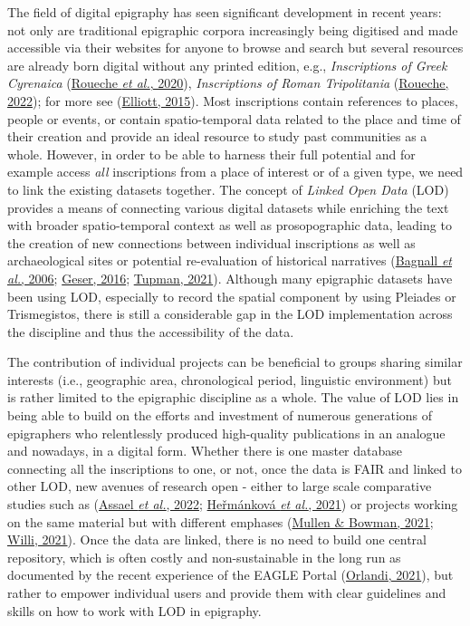 \documentclass[
  12pt,
]{scrreprt}
\begin{document}
The field of digital epigraphy has seen significant development in
recent years: not only are traditional epigraphic corpora increasingly
being digitised and made accessible via their websites for anyone to
browse and search but several resources are already born digital without
any printed edition, e.g., \emph{Inscriptions of Greek Cyrenaica}
(\protect\hyperlink{ref-roueche_inscriptions_2020}{Roueche \emph{et
al.}, 2020}), \emph{Inscriptions of Roman Tripolitania}
(\protect\hyperlink{ref-roueche_inscriptions_2022}{Roueche, 2022}); for
more see (\protect\hyperlink{ref-bruun_epigraphy_2015}{Elliott, 2015}).
Most inscriptions contain references to places, people or events, or
contain spatio-temporal data related to the place and time of their
creation and provide an ideal resource to study past communities as a
whole. However, in order to be able to harness their full potential and
for example access \emph{all} inscriptions from a place of interest or
of a given type, we need to link the existing datasets together. The
concept of \emph{Linked Open Data} (LOD) provides a means of connecting
various digital datasets while enriching the text with broader
spatio-temporal context as well as prosopographic data, leading to the
creation of new connections between individual inscriptions as well as
archaeological sites or potential re-evaluation of historical narratives
(\protect\hyperlink{ref-bagnall_pleiades_2006}{Bagnall \emph{et al.},
2006}; \protect\hyperlink{ref-geser_wp15_2016}{Geser, 2016};
\protect\hyperlink{ref-tupman_where_2021}{Tupman, 2021}). Although many
epigraphic datasets have been using LOD, especially to record the
spatial component by using Pleiades or Trismegistos, there is still a
considerable gap in the LOD implementation across the discipline and
thus the accessibility of the data.

The contribution of individual projects can be beneficial to groups
sharing similar interests (i.e., geographic area, chronological period,
linguistic environment) but is rather limited to the epigraphic
discipline as a whole. The value of LOD lies in being able to build on
the efforts and investment of numerous generations of epigraphers who
relentlessly produced high-quality publications in an analogue and
nowadays, in a digital form. Whether there is one master database
connecting all the inscriptions to one, or not, once the data is FAIR
and linked to other LOD, new avenues of research open - either to large
scale comparative studies such as
(\protect\hyperlink{ref-assael_restoring_2022}{Assael \emph{et al.},
2022}; \protect\hyperlink{ref-hermankova_inscriptions_2021}{Heřmánková
\emph{et al.}, 2021}) or projects working on the same material but with
different emphases (\protect\hyperlink{ref-mullen_manual_2021}{Mullen \&
Bowman, 2021}; \protect\hyperlink{ref-willi_manual_2021}{Willi, 2021}).
Once the data are linked, there is no need to build one central
repository, which is often costly and non-sustainable in the long run as
documented by the recent experience of the EAGLE Portal
(\protect\hyperlink{ref-orlandi_digital_2021}{Orlandi, 2021}), but
rather to empower individual users and provide them with clear
guidelines and skills on how to work with LOD in epigraphy.
\end{document}
